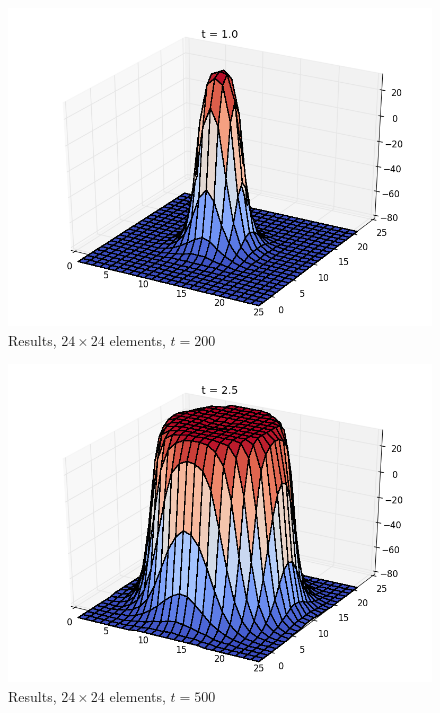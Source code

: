 \begin{figure}[ht]
  \centering 
  \includegraphics[width=0.9\columnwidth]{examples/example-0402/doc/figures/current_run_l1x1_n24x24_i1_s0_p1__t200.png} 
  \caption{Results, $24 \times 24$ elements, $t=200$}
  \label{example-0402-current-run2-fig}
\end{figure}

\begin{figure}[ht]
  \centering 
  \includegraphics[width=0.9\columnwidth]{examples/example-0402/doc/figures/current_run_l1x1_n24x24_i1_s0_p1__t500.png} 
  \caption{Results, $24 \times 24$ elements, $t=500$}
  \label{example-0402-current-run3-fig}
\end{figure}

